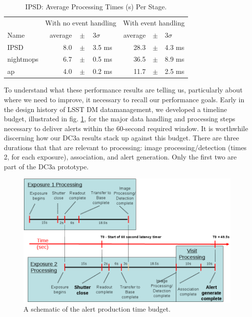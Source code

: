 \begin{table}[htbp]
\begin{center}
\caption{IPSD: Average Processing Times (s) Per Stage. 
\label{tbl:stageoverhead}}
\vspace{\baselineskip}
\begin{tabular}{l|crcl|crcl}
\hline\hline
      & \multicolumn{4}{c|}{With no event handling} 
      & \multicolumn{4}{c}{With event handling} \\
Name  & \multicolumn{2}{r}{average} &$\pm$& \multicolumn{1}{l|}{$3\sigma$}
      & \multicolumn{2}{r}{average} &$\pm$& \multicolumn{1}{l}{$3\sigma$} \\
\hline
IPSD      && 8.0 &$\pm$& 3.5 ms&& 28.3 &$\pm$& 4.3 ms \\ 
nightmops && 6.7 &$\pm$& 0.5 ms&& 36.5 &$\pm$& 8.9 ms \\
ap        &\hfil& 4.0 &$\pm$& 0.2 ms&& 11.7 &$\pm$& 2.5 ms \\ 
\hline
\end{tabular}
\end{center}
\end{table}

To understand what these performance results are telling us, particularly
about where we need to improve, it necessary to recall our performance
goals.  Early in the design history of LSST DM datamanagement, we developed a
timeline budget, illustrated in fig. \ref{fig:timeline}, for the major
data handling and processing steps necessary to deliver alerts within
the 60-second required window.  It is worthwhile discerning how our
DC3a results stack up against this budget.  There are three durations
that that are relevant to processing:  image processing/detection
(times 2, for each exposure), association, and alert generation.
Only the first two are part of the DC3a prototype.  

\begin{figure}[t]
\begin{center}
\includegraphics[width=\textwidth]{images/timeline.png}
\caption{A schematic of the alert production time budget.
\label{fig:timeline}}
\end{center}
\end{figure}

